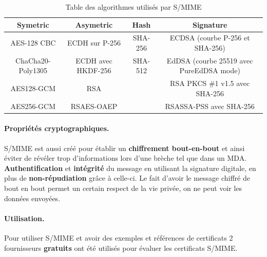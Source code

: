 \begin{table}[h!]
	\centering
	\caption{Table des algorithmes utilisés par S/MIME}
	\label{table:refSMIMEAlgos}
	\begin{adjustbox}{width=\textwidth}
		\begin{tabular}{||c c c c||}
			\hline
			Symetric & Asymetric & Hash & Signature \\ [0.5ex]
			\hline\hline
			AES-128 CBC & ECDH sur P-256 & SHA-256 & ECDSA (courbe P-256 et SHA-256) \\
			ChaCha20-Poly1305 & ECDH  avec HKDF-256 & SHA-512 & EdDSA (courbe 25519 avec PureEdDSA mode) \\
			AES128-GCM & RSA & & RSA PKCS \#1 v1.5 avec SHA-256 \\
			AES256-GCM & RSAES-OAEP & & RSASSA-PSS avec SHA-256\\
			\hline
		\end{tabular}
	\end{adjustbox}
	
\end{table}
\paragraph*{Propriétés cryptographiques.}
S/MIME est aussi créé pour établir un \textbf{chiffrement bout-en-bout} et ainsi éviter de révéler trop d'informations lors d'une brèche tel que dans un MDA. 
\textbf{Authentification} et \textbf{intégrité} du message en utilisant la signature digitale, en plus de \textbf{non-répudiation} grâce à celle-ci. Le fait d'avoir le message chiffré de bout en bout permet un certain respect de la vie privée, on ne peut voir les données envoyées.
\paragraph*{Utilisation.}
Pour utiliser S/MIME et avoir des exemples et références de certificats 2 fournisseurs \textbf{gratuits} ont été utilisés pour évaluer les certificats S/MIME.

